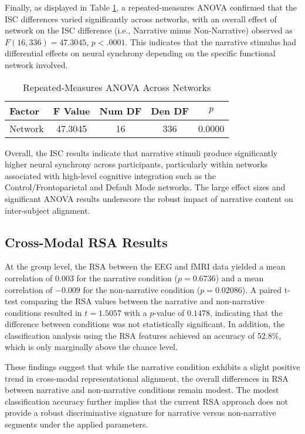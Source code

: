 \documentclass[stu,12pt,floatsintext]{apa7}
\begin{document}
Finally, as displayed in Table \ref{tab:anova}, a repeated-measures ANOVA confirmed that the ISC differences varied significantly across networks, with an overall effect of network on the ISC difference (i.e., Narrative minus Non-Narrative) observed as $F(16, 336) = 47.3045$, $p < .0001$. This indicates that the narrative stimulus had differential effects on neural synchrony depending on the specific functional network involved.

\begin{table}[ht!]
\centering
\caption{Repeated-Measures ANOVA Across Networks}
\label{tab:anova}
\begin{tabular}{lcccc}
\hline
\textbf{Factor} & \textbf{F Value} & \textbf{Num DF} & \textbf{Den DF} & \textbf{$p$} \\
\hline
Network       & 47.3045 & 16 & 336 & 0.0000 \\
\hline
\end{tabular}
\end{table}

Overall, the ISC results indicate that narrative stimuli produce significantly higher neural synchrony across participants, particularly within networks associated with high-level cognitive integration such as the Control/Frontoparietal and Default Mode networks. The large effect sizes and significant ANOVA results underscore the robust impact of narrative content on inter-subject alignment.

\subsection{Cross-Modal RSA Results}
At the group level, the RSA between the EEG and fMRI data yielded a mean correlation of 0.003 for the narrative condition ($p=0.6736$) and a mean correlation of $-0.009$ for the non-narrative condition ($p=0.02086$). A paired t-test comparing the RSA values between the narrative and non-narrative conditions resulted in $t=1.5057$ with a $p$-value of $0.1478$, indicating that the difference between conditions was not statistically significant. In addition, the classification analysis using the RSA features achieved an accuracy of 52.8\%, which is only marginally above the chance level.

These findings suggest that while the narrative condition exhibits a slight positive trend in cross-modal representational alignment, the overall differences in RSA between narrative and non-narrative conditions remain modest. The modest classification accuracy further implies that the current RSA approach does not provide a robust discriminative signature for narrative versus non-narrative segments under the applied parameters.
\end{document}
